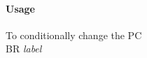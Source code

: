 \documentclass[12pt]{article}
\begin{document}
    \paragraph{Usage}
    \begin{flushleft}
    To conditionally change the PC \\
    \vspace{1em}
    BR \textit{label} 
    \end{flushleft}

    
\end{document}
